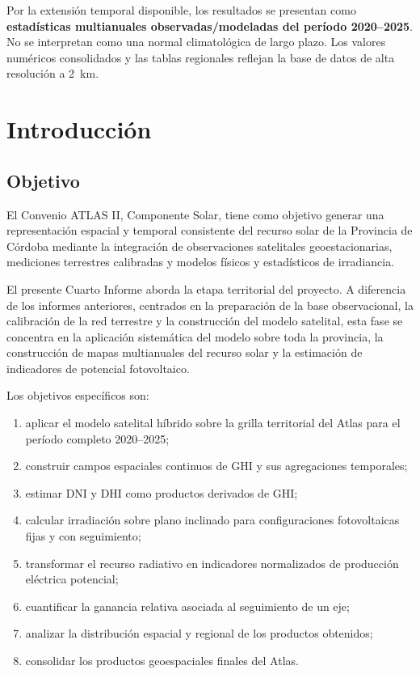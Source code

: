 \documentclass[11pt,a4paper]{article}
\begin{document}
Por la extensión temporal disponible, los resultados se presentan como \textbf{estadísticas multianuales observadas/modeladas del período 2020--2025}. No se interpretan como una normal climatológica de largo plazo. Los valores numéricos consolidados y las tablas regionales reflejan la base de datos de alta resolución a 2~km.

\newpage
\tableofcontents
\newpage


\section{Introducción}

\subsection{Objetivo}

El Convenio ATLAS II, Componente Solar, tiene como objetivo generar una representación espacial y temporal consistente del recurso solar de la Provincia de Córdoba mediante la integración de observaciones satelitales geoestacionarias, mediciones terrestres calibradas y modelos físicos y estadísticos de irradiancia.

El presente Cuarto Informe aborda la etapa territorial del proyecto. A diferencia de los informes anteriores, centrados en la preparación de la base observacional, la calibración de la red terrestre y la construcción del modelo satelital, esta fase se concentra en la aplicación sistemática del modelo sobre toda la provincia, la construcción de mapas multianuales del recurso solar y la estimación de indicadores de potencial fotovoltaico.

Los objetivos específicos son:

\begin{enumerate}[label=\arabic*)]
    \item aplicar el modelo satelital híbrido sobre la grilla territorial del Atlas para el período completo 2020--2025;
    \item construir campos espaciales continuos de GHI y sus agregaciones temporales;
    \item estimar DNI y DHI como productos derivados de GHI;
    \item calcular irradiación sobre plano inclinado para configuraciones fotovoltaicas fijas y con seguimiento;
    \item transformar el recurso radiativo en indicadores normalizados de producción eléctrica potencial;
    \item cuantificar la ganancia relativa asociada al seguimiento de un eje;
    \item analizar la distribución espacial y regional de los productos obtenidos;
    \item consolidar los productos geoespaciales finales del Atlas.
\end{enumerate}
\end{document}
